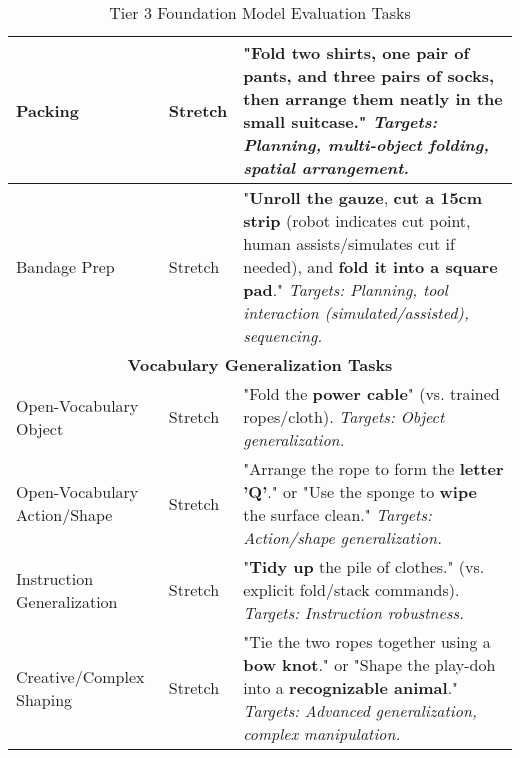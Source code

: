 \begin{table}[h]
\begin{tabular}{|p{3.5cm}|p{2cm}|p{8.5cm}|}
\hline
Packing & Stretch & "\textbf{Fold two shirts, one pair of pants, and three pairs of socks}, then \textbf{arrange them neatly} in the small suitcase." \textit{Targets: Planning, multi-object folding, spatial arrangement.} \\
\hline
Bandage Prep & Stretch & "\textbf{Unroll the gauze}, \textbf{cut a 15cm strip} (robot indicates cut point, human assists/simulates cut if needed), and \textbf{fold it into a square pad}." \textit{Targets: Planning, tool interaction (simulated/assisted), sequencing.} \\
\hline
\multicolumn{3}{|c|}{\textbf{Vocabulary Generalization Tasks}} \\
\hline
Open-Vocabulary Object & Stretch & "Fold the \textbf{power cable}" (vs. trained ropes/cloth). \textit{Targets: Object generalization.} \\
\hline
Open-Vocabulary Action/Shape & Stretch & "Arrange the rope to form the \textbf{letter 'Q'}." or "Use the sponge to \textbf{wipe} the surface clean." \textit{Targets: Action/shape generalization.} \\
\hline
Instruction Generalization & Stretch & "\textbf{Tidy up} the pile of clothes." (vs. explicit fold/stack commands). \textit{Targets: Instruction robustness.} \\
\hline
Creative/Complex Shaping & Stretch & "Tie the two ropes together using a \textbf{bow knot}." or "Shape the play-doh into a \textbf{recognizable animal}." \textit{Targets: Advanced generalization, complex manipulation.} \\
\hline
\end{tabular}
\caption{Tier 3 Foundation Model Evaluation Tasks}
\end{table}